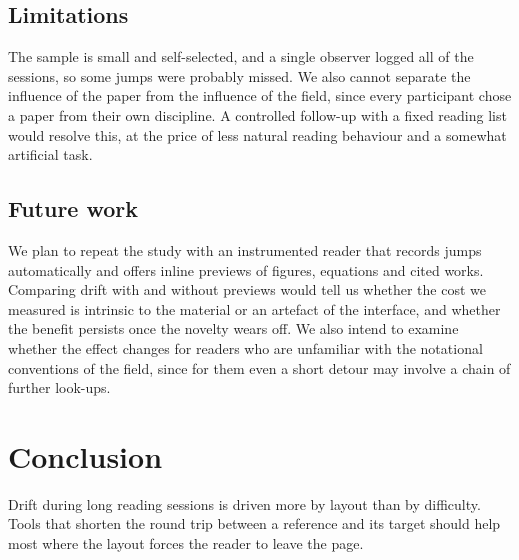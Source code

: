 \documentclass[11pt]{article}
\begin{document}
\subsection{Limitations}

The sample is small and self-selected, and a single observer logged all of
the sessions, so some jumps were probably missed. We also cannot separate the
influence of the paper from the influence of the field, since every
participant chose a paper from their own discipline. A controlled follow-up
with a fixed reading list would resolve this, at the price of less natural
reading behaviour and a somewhat artificial task.

\subsection{Future work}

We plan to repeat the study with an instrumented reader that records jumps
automatically and offers inline previews of figures, equations and cited
works. Comparing drift with and without previews would tell us whether the
cost we measured is intrinsic to the material or an artefact of the
interface, and whether the benefit persists once the novelty wears off. We
also intend to examine whether the effect changes for readers who are
unfamiliar with the notational conventions of the field, since for them even
a short detour may involve a chain of further look-ups.

\section{Conclusion}

Drift during long reading sessions is driven more by layout than by
difficulty. Tools that shorten the round trip between a reference and its
target should help most where the layout forces the reader to leave the page.
\end{document}
